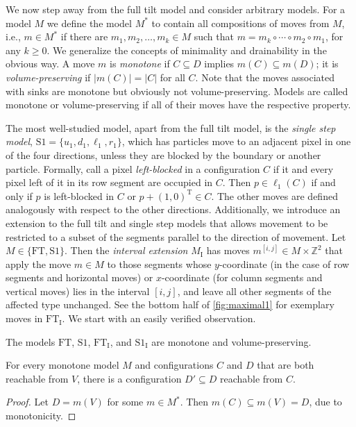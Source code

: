 \documentclass[a4paper,UKenglish,cleveref,thm-restate]{lipics-v2021}
\newcommand{\ZZ}{\ensuremath{\mathbb{Z}^2}}
\newcommand{\Tpose}{\ensuremath{\mathrm{T}}}
\newcommand{\FT}{\ensuremath{\mathrm{FT}}\xspace}
\newcommand{\SSt}{\ensuremath{\mathrm{S1}}\xspace}
\newcommand{\IE}[1][\FT]{\ensuremath{{#1}_\mathrm{I}}\xspace}
\newcommand{\mSeq}[1][k]{\ensuremath{m_1,m_2,\ldots,m_{#1}}}
\newcommand{\mComp}[1][k]{\ensuremath{m_{#1}\circ\cdots\circ m_2 \circ m_1}}
\begin{document}
We now step away from the full tilt model and consider arbitrary models. For a model $M$ we
define the model $M^*$ to contain all compositions of moves from $M$, i.e., \(m
\in M^*\) if there are $\mSeq \in M$ such that $m = \mComp$, for any \(k \geq
0\). We generalize the concepts of minimality and drainability in the obvious
way. A move $m$ is \emph{monotone} if \(C \subseteq D\) implies \(m(C) \subseteq
m(D)\); it is \emph{volume-preserving} if \(|m(C)| = |C|\) for all $C$. Note
that the moves associated with sinks are monotone but obviously not
volume-preserving. Models are called monotone or volume-preserving if all of
their moves have the respective property.

The most well-studied model, apart from the full tilt model, is the
\emph{single step model}, \(\SSt = \{u_1, d_1, \ell_1, r_1\}\), which has
particles move to an adjacent pixel in one of the four directions, unless they
are blocked by the boundary or another particle. Formally, call a pixel
\emph{left-blocked} in a configuration $C$ if it and every pixel left of it in
its row segment are occupied in $C$. Then \(p \in \ell_1(C)\) if and only if $p$
is left-blocked in $C$ or \(p + (1,0)^\Tpose \in C\). The other moves are
defined analogously with respect to the other directions. Additionally, we
introduce an extension to the full tilt and single step models that allows
movement to be restricted to a subset of the segments parallel to the direction
of movement. Let $M \in \{\FT, \SSt\}$. Then the \emph{interval extension}
$\IE[M]$ has moves $m^{[i,j]} \in M \times \ZZ$ that apply the move $m \in M$ to
those segments whose $y$-coordinate (in the case of row segments and horizontal
moves) or $x$-coordinate (for column segments and vertical moves) lies in the
interval $[i,j]$, and leave all other segments of the affected type unchanged.
See the bottom half of \cref{fig:maximal1} for exemplary moves in \IE.
We start with an easily verified observation.

\begin{observation}\label{obs:concrete-properties}
The models \FT, \SSt, \IE, and \IE[\SSt] are monotone and volume-preserving.
\end{observation}

\begin{lemma}
    \label{lem:mono-confluence}
    For every monotone model $M$ and configurations $C$ and $D$ that are both
    reachable from $V$, there is a configuration $D' \subseteq D$ reachable from
    $C$.
\end{lemma}
\begin{proof}
    Let $D = m(V)$ for some $m \in M^*$. Then \(m(C) \subseteq m(V) = D\), due to
    monotonicity.
\end{proof}
\end{document}
